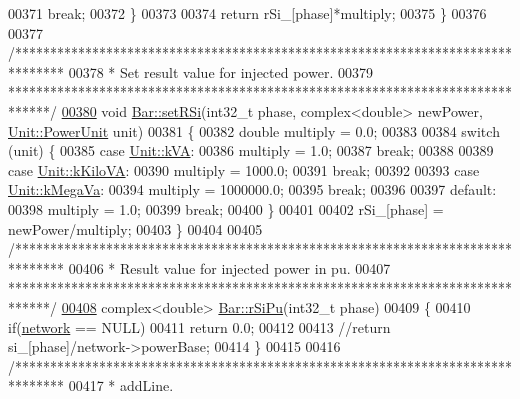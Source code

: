 \begin{DoxyCode}
00371     \textcolor{keywordflow}{break};
00372   \}
00373 
00374   \textcolor{keywordflow}{return} rSi\_[phase]*multiply;
00375 \}
00376 
00377 \textcolor{comment}{/*******************************************************************************}
00378 \textcolor{comment}{ * Set result value for injected power.}
00379 \textcolor{comment}{ ******************************************************************************/}
\hypertarget{bar_8cpp_source_l00380}{}\hyperlink{group___models_ga36d3d54b66584a0557c0c141f4636d4c}{00380} \textcolor{keywordtype}{void} \hyperlink{group___models_ga36d3d54b66584a0557c0c141f4636d4c}{Bar::setRSi}(int32\_t phase, complex<double> newPower, 
      \hyperlink{class_unit_ace265ae255370ccacfd5370337572c3b}{Unit::PowerUnit} unit)
00381 \{
00382   \textcolor{keywordtype}{double} multiply = 0.0;
00383 
00384   \textcolor{keywordflow}{switch} (unit) \{
00385   \textcolor{keywordflow}{case} \hyperlink{class_unit_ace265ae255370ccacfd5370337572c3ba72b181a842ae2759488a2fa1410d3696}{Unit::kVA}:
00386     multiply = 1.0;
00387     \textcolor{keywordflow}{break};
00388 
00389   \textcolor{keywordflow}{case} \hyperlink{class_unit_ace265ae255370ccacfd5370337572c3bac9e5154522fbb810d7aed75c3ff47cb2}{Unit::kKiloVA}:
00390     multiply = 1000.0;
00391     \textcolor{keywordflow}{break};
00392 
00393   \textcolor{keywordflow}{case} \hyperlink{class_unit_ace265ae255370ccacfd5370337572c3ba6039da0ed20f8bee64305bab8bdec365}{Unit::kMegaVa}:
00394     multiply = 1000000.0;
00395     \textcolor{keywordflow}{break};
00396 
00397   \textcolor{keywordflow}{default}:
00398     multiply = 1.0;
00399     \textcolor{keywordflow}{break};
00400   \}
00401 
00402   rSi\_[phase] = newPower/multiply;
00403 \}
00404 
00405 \textcolor{comment}{/*******************************************************************************}
00406 \textcolor{comment}{ * Result value for injected power in pu.}
00407 \textcolor{comment}{ ******************************************************************************/}
\hypertarget{bar_8cpp_source_l00408}{}\hyperlink{group___models_ga1fa1b99d17dd19fafcf8309aba4fc758}{00408} complex<double> \hyperlink{group___models_ga1fa1b99d17dd19fafcf8309aba4fc758}{Bar::rSiPu}(int32\_t phase)
00409 \{
00410   \textcolor{keywordflow}{if}(\hyperlink{class_bar_a80025f13884750add58cc61b318357ff}{network} == NULL)
00411     \textcolor{keywordflow}{return} 0.0;
00412 
00413   \textcolor{comment}{//return si\_[phase]/network->powerBase;}
00414 \}
00415 
00416 \textcolor{comment}{/*******************************************************************************}
00417 \textcolor{comment}{ * addLine.}

\end{DoxyCode}
